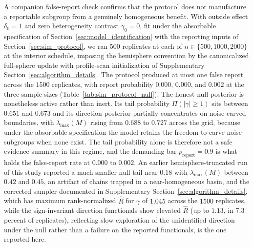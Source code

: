 \documentclass[11pt]{article}
\theoremstyle{definition}
\theoremstyle{plain}
\begin{document}
A companion false-report check confirms that the protocol does not manufacture a reportable subgroup from a genuinely homogeneous benefit. With outside effect $\delta_0=1$ and zero heterogeneity contrast $\gamma_0=0$, fit under the absorbable specification of Section~\ref{sec:model_identification} with the reporting inputs of Section~\ref{sec:sim_protocol}, we ran $500$ replicates at each of $n\in\{500,1000,2000\}$ at the interior schedule, imposing the hemisphere convention by the canonicalized full-sphere update with profile-scan initialization of Supplementary Section~\ref{sec:algorithm_details}. The protocol produced at most one false report across the $1500$ replicates, with report probability $0.000$, $0.000$, and $0.002$ at the three sample sizes (Table~\ref{tab:sim_protocol_null}). The honest null posterior is nonetheless active rather than inert. Its tail probability $\Pi(|\gamma|\ge1)$ sits between $0.651$ and $0.673$ and its direction posterior partially concentrates on noise-carved boundaries, with $\lambda_{\max}(M)$ rising from $0.688$ to $0.727$ across the grid, because under the absorbable specification the model retains the freedom to carve noise subgroups when none exist. The tail probability alone is therefore not a safe evidence summary in this regime, and the demanding bar $p_{\mathrm{report}}=0.9$ is what holds the false-report rate at $0.000$ to $0.002$. An earlier hemisphere-truncated run of this study reported a much smaller null tail near $0.18$ with $\lambda_{\max}(M)$ between $0.42$ and $0.45$, an artifact of chains trapped in a near-homogeneous basin, and the corrected sampler documented in Supplementary Section~\ref{sec:algorithm_details}, which has maximum rank-normalized $\widehat R$ for $\gamma$ of $1.045$ across the $1500$ replicates, while the sign-invariant direction functionals show elevated $\widehat R$ (up to $1.13$, in $7.3$ percent of replicates), reflecting slow exploration of the unidentified direction under the null rather than a failure on the reported functionals, is the one reported here.
\end{document}
